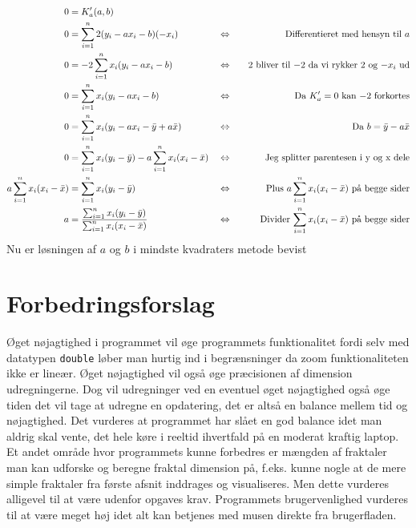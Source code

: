 \documentclass{article}
\begin{document}
\begin{align*}
0&=K'_a(a,b)\\
0&=\sum_{i=1}^{n}2(y_i-ax_i-b) (-x_i)                                      &&\Leftrightarrow &&&\text{Differentieret med hensyn til $a$} \\
0&=-2\sum_{i=1}^{n}x_i(y_i-ax_i-b)                                         &&\Leftrightarrow &&&\text{$2$ bliver til $-2$ da vi rykker 2 og $-x_i$ ud} \\
0&=\sum_{i=1}^{n}x_i(y_i-ax_i-b)                                           &&\Leftrightarrow &&&\text{Da $K'_a=0$ kan $-2$ forkortes}\\
0&=\sum_{i=1}^{n}x_i(y_i-ax_i-\Bar{y}+a\Bar{x})                            &&\Leftrightarrow &&&\text{Da $b = \Bar{y}-a\Bar{x}$}\\
0&=\sum_{i=1}^{n}x_i(y_i-\Bar{y})-a\sum_{i=1}^{n}x_i(x_i-\Bar{x})          &&\Leftrightarrow &&&\text{Jeg splitter parentesen i y og x dele}\\
a\sum_{i=1}^{n}x_i(x_i-\Bar{x})&=\sum_{i=1}^{n}x_i(y_i-\Bar{y})            &&\Leftrightarrow &&&\text{Plus $a\sum_{i=1}^{n}x_i(x_i-\Bar{x})$ på begge sider}\\
a&= \frac{\sum_{i=1}^{n}x_i(y_i-\Bar{y})}{\sum_{i=1}^{n}x_i(x_i-\Bar{x})}  &&\Leftrightarrow &&&\text{Divider $\sum_{i=1}^{n}x_i(x_i-\Bar{x})$ på begge sider}\\
\end{align*}
Nu er løsningen af $a$ og $b$ i mindste kvadraters metode bevist
\hfill\blacksquare
\section{Forbedringsforslag}
Øget nøjagtighed i programmet vil øge programmets funktionalitet fordi selv med datatypen \texttt{double} løber man hurtig ind i begrænsninger da zoom funktionaliteten ikke er lineær. Øget nøjagtighed vil også øge præcisionen af dimension udregningerne. Dog vil udregninger ved en eventuel øget nøjagtighed også øge tiden det vil tage at udregne en opdatering, det er altså en balance mellem tid og nøjagtighed. Det vurderes at programmet har slået en god balance idet man aldrig skal vente, det hele køre i reeltid ihvertfald på en moderat kraftig laptop. Et andet område hvor programmets kunne forbedres er mængden af fraktaler man kan udforske og beregne fraktal dimension på, f.eks. kunne nogle at de mere simple fraktaler fra første afsnit inddrages og visualiseres. Men dette vurderes alligevel til at være udenfor opgaves krav. Programmets brugervenlighed vurderes til at være meget høj idet alt kan betjenes med musen direkte fra brugerfladen.
\end{document}

